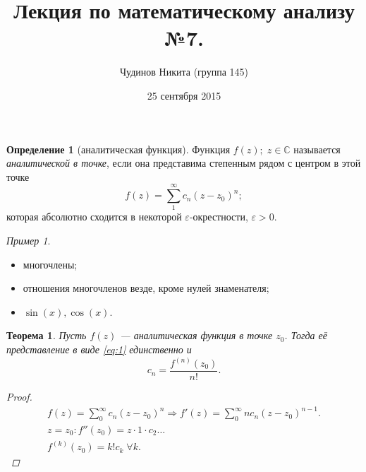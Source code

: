 \documentclass[a4paper,12pt]{article}
\newtheorem*{theorem}{Теорема}
\theoremstyle{remark}
\newtheorem*{example}{Пример}
\theoremstyle{definition}
\newtheorem{definition}{Определение}
\begin{document}
\sloppy
\author{Чудинов Никита (группа 145)}
\date{25 сентября 2015}
\title{\vspace{-2.0cm}Лекция по математическому анализу №7.}
\frenchspacing
 
\maketitle

\begin{definition}[аналитическая функция]
    Функция \(f(z);\;z \in \mathbb{C}\) называется \emph{аналитической в точке}, если она представима степенным рядом с центром в этой точке
    \begin{equation} \label{eq:1}
         f(z) = \sum_1^\infty c_n(z - z_0)^n;
    \end{equation}
    которая абсолютно сходится в некоторой \(\varepsilon\)-окрестности, \(\varepsilon > 0\).
\end{definition}

\begin{example} \(\)
    \begin{itemize}
        \item многочлены;
        \item отношения многочленов везде, кроме нулей знаменателя;
        \item \(\sin(x), \cos(x)\).
    \end{itemize}
\end{example}

\begin{theorem}
    Пусть \(f(z)\) --- аналитическая функция в точке \(z_0\). Тогда её представление в виде \eqref{eq:1} единственно и
    \begin{equation*}
        c_n = \frac{f^{(n)}(z_0)}{n!}.
    \end{equation*}

    \begin{proof}
        \begin{gather*}
            f(z) = \sum_0^\infty c_n(z - z_0)^n \Rightarrow f'(z) = \sum_0^\infty nc_n(z - z_0)^{n-1}. \\
            z = z_0: f''(z_0) = z \cdot 1 \cdot c_2 \ldots \\
            f^{(k)}(z_0) = k!c_k \;\forall k.
        \end{gather*}
        
    \end{proof}
\end{theorem}
\end{document}
